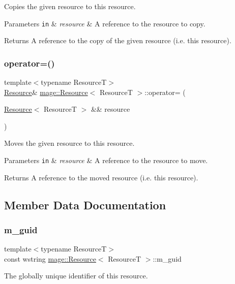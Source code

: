 Copies the given resource to this resource.


\begin{DoxyParams}[1]{Parameters}
\mbox{\tt in}  & {\em resource} & A reference to the resource to copy. \\
\hline
\end{DoxyParams}
\begin{DoxyReturn}{Returns}
A reference to the copy of the given resource (i.\+e. this resource). 
\end{DoxyReturn}
\hypertarget{classmage_1_1_resource_aff0080e944136b1b0e889d4dd6cfb11f}{}\label{classmage_1_1_resource_aff0080e944136b1b0e889d4dd6cfb11f} 
\subsubsection{\texorpdfstring{operator=()}{operator=()}\hspace{0.1cm}{\footnotesize\ttfamily [2/2]}}
{\footnotesize\ttfamily template$<$typename ResourceT$>$ \\
\hyperlink{classmage_1_1_resource}{Resource}\& \hyperlink{classmage_1_1_resource}{mage\+::\+Resource}$<$ ResourceT $>$\+::operator= (\begin{DoxyParamCaption}\item[{\hyperlink{classmage_1_1_resource}{Resource}$<$ ResourceT $>$ \&\&}]{resource }\end{DoxyParamCaption})\hspace{0.3cm}{\ttfamily [delete]}}

Moves the given resource to this resource.


\begin{DoxyParams}[1]{Parameters}
\mbox{\tt in}  & {\em resource} & A reference to the resource to move. \\
\hline
\end{DoxyParams}
\begin{DoxyReturn}{Returns}
A reference to the moved resource (i.\+e. this resource). 
\end{DoxyReturn}


\subsection{Member Data Documentation}
\hypertarget{classmage_1_1_resource_ad2924d9bc9ddecf06475b52a8c7065d8}{}\label{classmage_1_1_resource_ad2924d9bc9ddecf06475b52a8c7065d8} 
\subsubsection{\texorpdfstring{m\+\_\+guid}{m\_guid}}
{\footnotesize\ttfamily template$<$typename ResourceT$>$ \\
const wstring \hyperlink{classmage_1_1_resource}{mage\+::\+Resource}$<$ ResourceT $>$\+::m\+\_\+guid\hspace{0.3cm}{\ttfamily [private]}}

The globally unique identifier of this resource. 